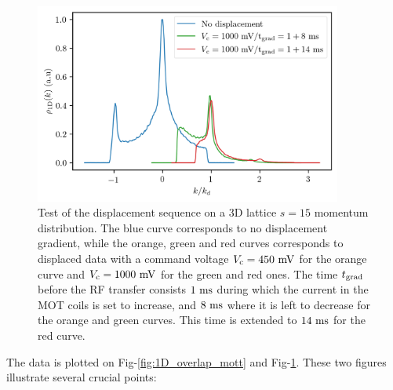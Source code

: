 \begin{figure}
    \centering
    \includegraphics[width=0.9\textwidth]{Fig/Chapter5/bad_overlap.png}
    \caption[Test of the displacement sequence on a 3D lattice $s=15$ momentum distribution]{Test of the displacement sequence on a 3D lattice $s=15$ momentum distribution. The blue curve corresponds to no displacement gradient, while the orange, green and red curves corresponds to displaced data with a command voltage $V_{\rm{c}}=450 \ \rm{mV}$ for the orange curve and $V_{\rm{c}}=1000 \ \rm{mV}$ for the green and red ones. The time $t_{\rm{grad}}$ before the RF transfer consists $1 \ \rm{ms}$ during which the current in the MOT coils is set to increase, and $8 \ \rm{ms}$ where it is left to decrease for the orange and green curves. This time is extended to $14 \ \rm{ms}$ for the red curve.}
    \label{fig:1D_bad_overlap_mott}
\end{figure}



The data is plotted on Fig-\ref{fig:1D_overlap_mott} and Fig-\ref{fig:1D_bad_overlap_mott}. These two figures illustrate several crucial points:

